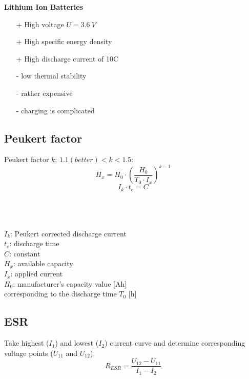 \begin{multicols}{2}
{	\textbf{Lithium Ion Batteries}
	
	\begin{itemize}
		\setlength{\itemsep}{0pt}
		\item[+] High voltage $U = 3.6~V$
		\item[+] High specific energy density
		\item[+] High discharge current of 10C
		\item[-] low thermal stability
		\item[-] rather expensive
		\item[-] charging is complicated
	\end{itemize}}	
	
\end{multicols}


\begin{multicols}{3}
\subsection{Peukert factor}
	Peukert factor $k$; $1.1 (better) < k < 1.5$: 
	\begin{equation*}
		H_x = H_0 \cdot \left(\frac{H_0}{T_0 \cdot I_x}\right)^{k-1}
	\end{equation*}	
	\begin{equation*}
		I_k \cdot t_e = C
	\end{equation*}
	\\ \\ \\
{\footnotesize 	\begin{tabbing}
		$I_k$: \hspace{0.1cm} \= Peukert corrected discharge current \\
		$t_e$: \> discharge time \\
		$C$: \> constant \\
		$H_x$: \> available capacity \\
		$I_x$: \> applied current \\
		$H_0$: \> manufacturer's capacity value [Ah] \\
		\> corresponding to the discharge time $T_0$ [h]
	\end{tabbing}}


\subsection{ESR}
Take highest ($I_1$) and lowest ($I_2$) current curve and determine corresponding voltage points ($U_{11}$ and $U_{12}$).
\begin{equation*}
	R_{ESR} = \frac{U_{12} - U_{11}}{I_1 - I_2}
\end{equation*}

\end{multicols}

